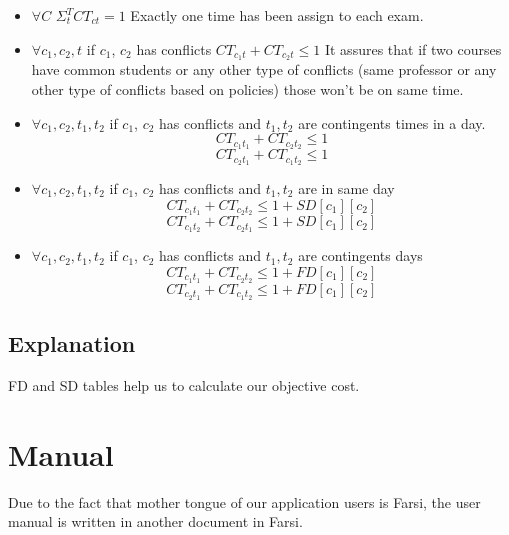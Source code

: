 \documentclass{report}
\begin{document}
\begin{itemize}
\item{$\forall C$ \space $\Sigma_t^T CT_{ct} = 1$ \newline 
Exactly one time has been assign to each exam.}

\item{$\forall c_1 , c_2 , t $ \space if $c_1$, $c_2$ has conflicts $CT_{c_1 t} + CT_{c_2 t} \le 1$
	\newline 
	It assures that if two courses have common students or any other type of conflicts (same professor or any other type of conflicts based on policies) those won't be on same time.
	 }

\item{$\forall c_1 , c_2 , t_1 , t_2$ \space if $c_1$, $c_2$ has conflicts and $t_1, t_2$ are contingents times in a day. $$CT_{c_1 t_1} + CT_{c_2 t_2} \le 1$$ $$CT_{c_2 t_1} + CT_{c_1 t_2} \le 1 $$ 
	}

\item{$\forall c_1 , c_2 , t_1, t_2 $ \space if $c_1$, $c_2$ has conflicts and $t_1 ,t_2 $ are in same day $$CT_{c_1 t_1} + CT_{c_2 t_2} \le 1 + SD[c_1][c_2]$$ 
$$CT_{c_1 t_2} + CT_{c_2 t_1} \le 1 + SD[c_1][c_2]$$}


\item{$\forall c_1 ,  c_2 ,  t_1 , t_2$ \space if $c_1$, $c_2$ has conflicts and $t_1 , t_2$ are contingents days $$CT_{c_1 t_1} + CT_{c_2 t_2} \le 1 + FD[c_1][c_2]$$ $$CT_{c_2 t_1} + CT_{c_1 t_2} \le 1 + FD[c_1][c_2]$$  }

\end{itemize}
\section{Explanation}
FD and SD tables help us to calculate our objective cost.
\chapter{Manual}
Due to the fact that mother tongue of our application users is Farsi, the user manual is written in another document in Farsi.
\end{document}
